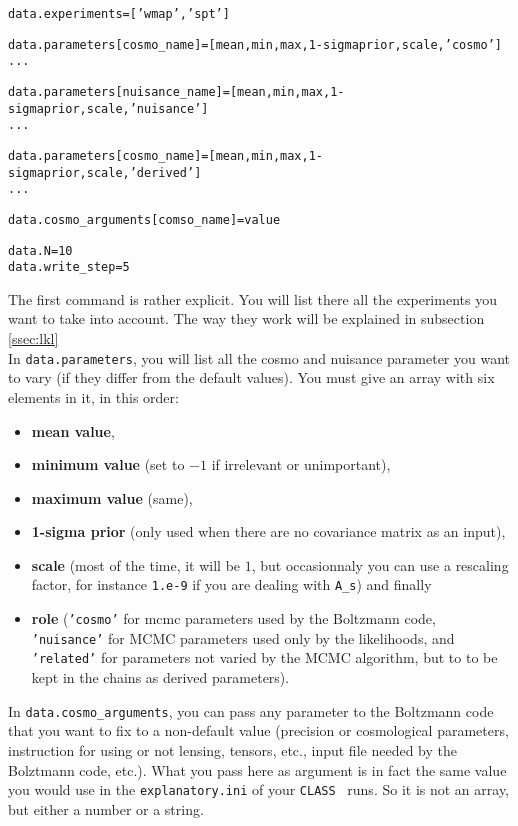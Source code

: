 \documentclass[10pt]{article}
\newcommand{\CLASS}{\texttt{CLASS}}
\begin{document}
  \begin{alltt}
    data.experiments = ['wmap','spt']
    
    data.parameters[cosmo_name]       = [mean,min,max,1-sigma prior,scale,'cosmo']
    ...

    data.parameters[nuisance_name]    = [mean,min,max,1-sigma prior,scale,'nuisance']
    ...

    data.parameters[cosmo_name]       = [mean,min,max,1-sigma prior,scale,'derived']
    ...

    data.cosmo_arguments[comso_name]           = value

    data.N = 10
    data.write_step = 5
  \end{alltt}

  The first command is rather explicit. You will list there all the experiments
  you want to take into account. The way they work will be explained in
  subsection \ref{ssec:lkl}\\

  In \verb?data.parameters?, you will list all the cosmo and nuisance parameter you
  want to vary (if they differ from the default values). You must give an array
  with six elements in it, in this order: 
  \begin{itemize}
    \item {\bf mean value}, 
    \item {\bf minimum value} (set to $-1$ if irrelevant or unimportant), 
    \item {\bf maximum value} (same), 
    \item {\bf 1-sigma prior} (only used when there are no covariance matrix as
      an input),
    \item {\bf scale} (most of the time, it will be $1$, but occasionnaly you can use a rescaling factor, for instance {\tt 1.e-9} if you are dealing with {\tt A\_s}) and finally 
    \item {\bf role} ({\tt 'cosmo'} for mcmc parameters used by the Boltzmann code, {\tt 'nuisance'} for MCMC parameters used only by the likelihoods, and {\tt 'related'} for parameters not varied by the MCMC algorithm, but to to be kept in the chains as derived parameters).
      \end{itemize}
  
  In  \verb?data.cosmo_arguments?, you can pass any parameter to the Boltzmann code that you want to fix to a non-default value (precision or cosmological parameters, instruction for using or not lensing, tensors, etc., input file needed by the Bolztmann code, etc.).
  What you
  pass here as argument is in fact the same value you would use in the
  \verb?explanatory.ini? of your \CLASS~ runs. So it is not an array, but either a
  number or a string.\\
\end{document}
